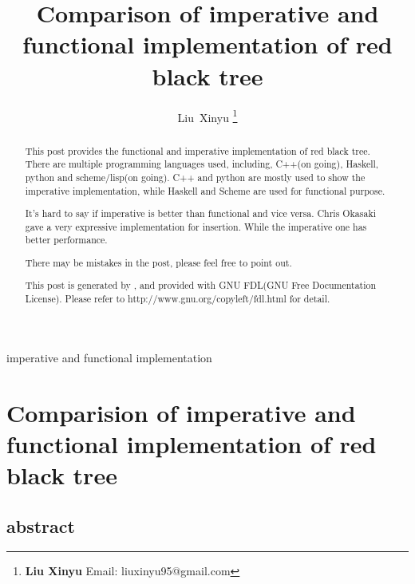 \documentclass{article}
\begin{document}
\fi


\title{Comparison of imperative and functional implementation of red black tree}

\author{Liu~Xinyu
\thanks{{\bfseries Liu Xinyu } \newline
  Email: liuxinyu95@gmail.com \newline}
  }

{imperative and functional implementation}

\maketitle

\ifx\wholebook\relax
\chapter{Comparision of imperative and functional implementation of red black tree}

\section{abstract}
\else
\begin{abstract}
\fi
This post provides the functional and imperative implementation of red black tree. There are
multiple programming languages used, including, C++(on going), Haskell, python and scheme/lisp(on going).
C++ and python are mostly used to show the imperative implementation, while Haskell and Scheme are
used for functional purpose.

It's hard to say if imperative is better than functional and vice versa. Chris Okasaki gave a very expressive implementation for insertion\cite{okasaki}. While the imperative one has better performance.

There may be mistakes in the post, please feel free to point out.

This post is generated by \LaTeXe, and provided with GNU FDL(GNU Free Documentation License).
Please refer to http://www.gnu.org/copyleft/fdl.html for detail.

\ifx\wholebook\relax\else
\end{abstract}
\fi
\end{document}
